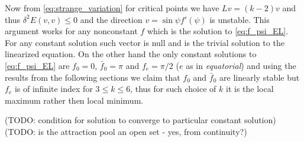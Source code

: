 Now from \eqref{eq:strange_variation} for critical points we have
$Lv=(k-2)v$ and thus $\delta^2 E(v,v)\le0$ and the direction
$v=\sin\psi f'(\psi)$ is unstable. This argument works for any
nonconstant $f$ which is the solution to \eqref{eq:f_psi_EL}. For any
constant solution such vector is null and is the trivial solution to
the linearized equation. On the other hand the only constant solutions
to \eqref{eq:f_psi_EL} are $f_0=0$, $\bar{f}_0=\pi$ and $f_e=\pi/2$
($e$ as in \emph{equatorial}) and using the results from the following
sections we claim that $f_0$ and $\bar{f}_0$ are linearly stable but
$f_e$ is of infinite index for $3\le k\le6$, thus for such choice of
$k$ it is the local maximum rather then local minimum.


(TODO: condition for solution to converge to particular constant
solution)
(TODO: is the attraction pool an open set - yes, from continuity?)

